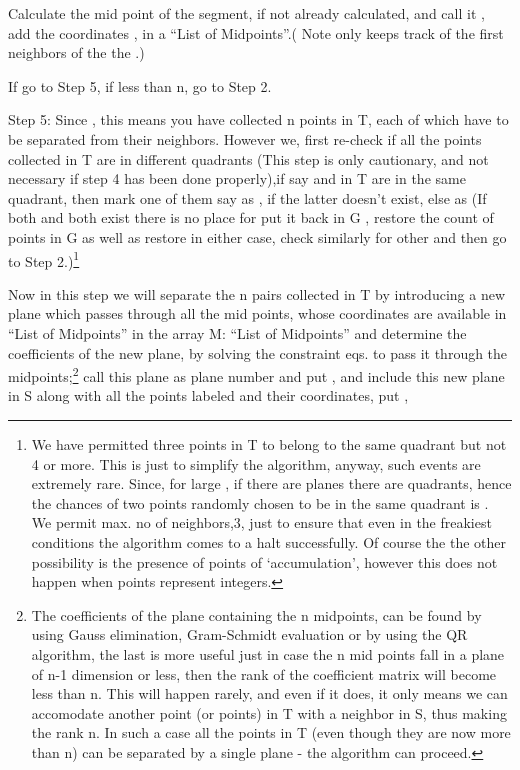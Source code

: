 \documentclass[english]{article}
\begin{document}
  Calculate the mid point of the \textquotedbl{}segment\textquotedbl{},
if not already calculated, and call it , add the coordinates
, in a {}``List of Midpoints''.( Note  only keeps track of the first neighbors of the the .)

If  go to Step 5, if less than n, go to Step 2.

Step 5: Since , this means you have collected n points
in T, each of which have to be separated from their neighbors. However
we, first re-check if all the  points collected in T are in different
quadrants (This step is only cautionary, and not necessary if step 4 has been done properly),if say  and  in T
are in the same quadrant, then mark one of them say 
as , if the latter doesn't exist, else as  (If both
and both exist there is no place for  put it
back in G , restore the count of points in G as well as restore in
either case, check similarly for other 
and then go to Step 2.)\footnote{We have permitted three points in T to belong to the same quadrant
but not 4 or more. This is just to simplify the algorithm, anyway,
such events are extremely rare. Since, for large , if there are
 planes there are  quadrants, hence the chances of two
points randomly chosen to be in the same quadrant is .
We permit max. no of neighbors,3, just to ensure that even in the
freakiest conditions the algorithm comes to a halt successfully. Of
course the the other possibility is the presence of points of `accumulation',
however this does not happen when points represent integers.}

Now in this step we will separate the n pairs collected in T by introducing
a new plane which passes through all the  mid points, whose coordinates
are available in {}``List of Midpoints'' in the array M: {}``List
of Midpoints'' and determine the coefficients of the new plane, by
solving the constraint eqs. to pass it through the  midpoints;\footnote{The coefficients of the plane containing the n midpoints, can be found
by using Gauss elimination, Gram-Schmidt evaluation or by using the
QR algorithm, the last is more useful just in case the n mid points
fall in a plane of n-1 dimension or less, then the rank of the coefficient
matrix will become less than n. This will happen rarely, and even
if it does, it only means we can accomodate another point (or points)
in T with a neighbor in S, thus making the rank n. In such a case
all the points in T (even though they are now more than n) can be
separated by a single plane - the algorithm can proceed.} call this plane as plane number  and put , and include
this new plane in S along with all the  points labeled 
and their coordinates, put ,
\end{document}
